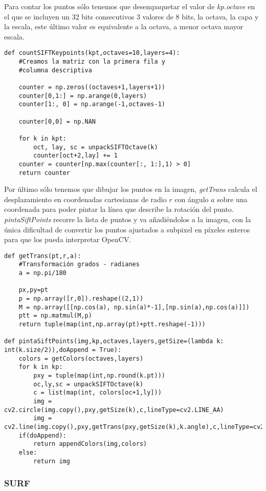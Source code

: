 \documentclass{article}
\begin{document}
Para contar los puntos sólo tenemos que desempaquetar el valor de \textit{kp.octave} en el que se incluyen un 32 bits consecutivos 3 valores de 8 bits, la octava, la capa y la escala, este último valor es equivalente a la octava, a menor octava mayor escala. 

\begin{lstlisting}
def countSIFTKeypoints(kpt,octaves=10,layers=4):
	#Creamos la matriz con la primera fila y
	#columna descriptiva
	
    counter = np.zeros((octaves+1,layers+1))
    counter[0,1:] = np.arange(0,layers)
    counter[1:, 0] = np.arange(-1,octaves-1)

    counter[0,0] = np.NAN

    for k in kpt:
        oct, lay, sc = unpackSIFTOctave(k)
        counter[oct+2,lay] += 1
    counter = counter[np.max(counter[:, 1:],1) > 0]
    return counter
\end{lstlisting}

Por último sólo tenemos que dibujar los puntos en la imagen, \textit{getTrans} calcula el desplazamiento en coordenadas cartesianas de radio $r$ con ángulo $a$ sobre una coordenada para poder pintar la línea que describe la rotación del punto. \textit{pintaSiftPoints} recorre la lista de puntos y va añadiéndolos a la imagen, con la única dificultad de convertir los puntos ajustados a subpixel en píxeles enteros para que los pueda interpretar OpenCV.

\begin{lstlisting}
def getTrans(pt,r,a):
	#Transformación grados - radianes
    a = np.pi/180 
    
    px,py=pt
    p = np.array([r,0]).reshape((2,1))
    M = np.array([[np.cos(a), np.sin(a)*-1],[np.sin(a),np.cos(a)]])
    ptt = np.matmul(M,p)
    return tuple(map(int,np.array(pt)+ptt.reshape(-1)))

def pintaSiftPoints(img,kp,octaves,layers,getSize=(lambda k: int(k.size/2)),doAppend = True):
    colors = getColors(octaves,layers)
    for k in kp:
        pxy = tuple(map(int,np.round(k.pt)))
        oc,ly,sc = unpackSIFTOctave(k)
        c = list(map(int, colors[oc+1,ly]))
        img = cv2.circle(img.copy(),pxy,getSize(k),c,lineType=cv2.LINE_AA)
        img = cv2.line(img.copy(),pxy,getTrans(pxy,getSize(k),k.angle),c,lineType=cv2.LINE_AA)
    if(doAppend):
        return appendColors(img,colors)
    else:
        return img
\end{lstlisting}

\subsubsection{SURF}
\end{document}
